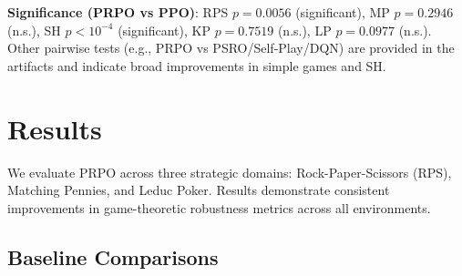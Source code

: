 \documentclass[sigconf,anonymous]{aamas}
\begin{document}
\begin{table}[t]
    \centering
    \caption{Gauntlet Robustness Score (Mean [95\% CI]) across 32 seeds. Higher is better.}
    \label{tab:gauntlet_results}
    {\small
    \setlength{\tabcolsep}{4pt}%
    }%
    \end{table}

\noindent \textbf{Significance (PRPO vs PPO)}: RPS $p=0.0056$ (significant), MP $p=0.2946$ (n.s.), SH $p<10^{-4}$ (significant), KP $p=0.7519$ (n.s.), LP $p=0.0977$ (n.s.). Other pairwise tests (e.g., PRPO vs PSRO/Self-Play/DQN) are provided in the artifacts and indicate broad improvements in simple games and SH.

\section{Results}
\label{sec:results}

We evaluate PRPO across three strategic domains: Rock-Paper-Scissors (RPS), Matching Pennies, and Leduc Poker. Results demonstrate consistent improvements in game-theoretic robustness metrics across all environments.

\subsection{Baseline Comparisons}
\end{document}
